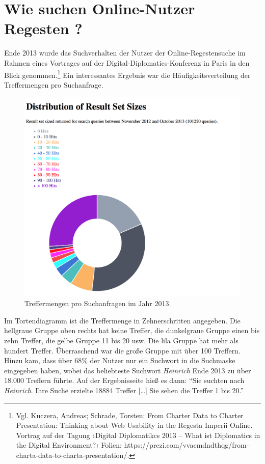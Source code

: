 \documentclass[ngerman,]{scrreprt}
\begin{document}
\hypertarget{wie-suchen-online-nutzer-regesten}{%
\section{Wie suchen Online-Nutzer Regesten ?}\label{wie-suchen-online-nutzer-regesten}}

Ende 2013 wurde das Suchverhalten der Nutzer der Online-Regestensuche im Rahmen eines Vortrages auf der Digital-Diplomatics-Konferenz in Paris in den Blick genommen.\footnote{Vgl. Kuczera, Andreas; Schrade, Torsten: From Charter Data to Charter Presentation: Thinking about Web Usability in the Regesta Imperii Online. Vortrag auf der Tagung ›Digital Diplomatikcs 2013 -- What ist Diplomatics in the Digital Environment?‹ Folien: https://prezi.com/vvacmdndthqg/from-charta-data-to-charta-presentation/.} Ein interessantes Ergebnis war die Häufigkeitsverteilung der Treffermengen pro Suchanfrage.

\begin{figure}
\centering
\includegraphics{Bilder/2012-Nutzungsformen_der_RI.png}
\caption{Treffermengen pro Suchanfragen im Jahr 2013.}
\end{figure}

Im Tortendiagramm ist die Treffermenge in Zehnerschritten angegeben. Die hellgraue Gruppe oben rechts hat keine Treffer, die dunkelgraue Gruppe einen bis zehn Treffer, die gelbe Gruppe 11 bis 20 usw. Die lila Gruppe hat mehr als hundert Treffer. Überraschend war die große Gruppe mit über 100 Treffern. Hinzu kam, dass über 68\% der Nutzer nur ein Suchwort in die Suchmaske eingegeben haben, wobei das beliebteste Suchwort \emph{Heinrich} Ende 2013 zu über 18.000 Treffern führte. Auf der Ergebnisseite hieß es dann: ``Sie suchten nach \emph{Heinrich}. Ihre Suche erzielte 18884 Treffer {[}\ldots{}{]} Sie sehen die Treffer 1 bis 20.''
\end{document}

